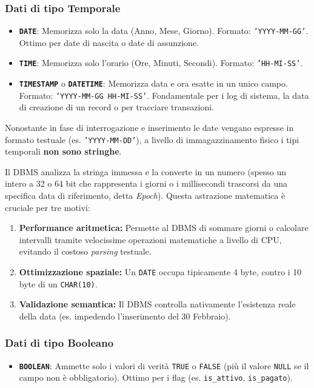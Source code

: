 \subsubsection*{Dati di tipo Temporale}
\begin{itemize}
    \item \texttt{\textbf{DATE}}: Memorizza solo la data (Anno, Mese, Giorno). Formato: \texttt{'YYYY-MM-GG'}. Ottimo per date di nascita o date di assunzione.
    \item \texttt{\textbf{TIME}}: Memorizza solo l'orario (Ore, Minuti, Secondi). Formato: \texttt{'HH-MI-SS'}.
    \item \texttt{\textbf{TIMESTAMP}} o \texttt{\textbf{DATETIME}}: Memorizza data e ora esatte in un unico campo. Formato: \texttt{'YYYY-MM-GG HH-MI-SS'}. Fondamentale per i log di sistema, la data di creazione di un record o per tracciare transazioni.
\end{itemize}

\begin{dettagli}
Nonostante in fase di interrogazione e inserimento le date vengano espresse in formato testuale (es. \texttt{'YYYY-MM-DD'}), a livello di immagazzinamento fisico i tipi temporali \textbf{non sono stringhe}. 

Il DBMS analizza la stringa immessa e la converte in un numero (spesso un intero a 32 o 64 bit che rappresenta i giorni o i millisecondi trascorsi da una specifica data di riferimento, detta \textit{Epoch}). 
Questa astrazione matematica è cruciale per tre motivi:
\begin{enumerate}
    \item \textbf{Performance aritmetica:} Permette al DBMS di sommare giorni o calcolare intervalli tramite velocissime operazioni matematiche a livello di CPU, evitando il costoso \textit{parsing} testuale.
    \item \textbf{Ottimizzazione spaziale:} Un \texttt{DATE} occupa tipicamente 4 byte, contro i 10 byte di un \texttt{CHAR(10)}.
    \item \textbf{Validazione semantica:} Il DBMS controlla nativamente l'esistenza reale della data (es. impedendo l'inserimento del 30 Febbraio).
\end{enumerate}
\end{dettagli}

\subsubsection*{Dati di tipo Booleano}
\begin{itemize}
    \item \texttt{\textbf{BOOLEAN}}: Ammette solo i valori di verità \texttt{TRUE} o \texttt{FALSE} (più il valore \texttt{NULL} se il campo non è obbligatorio). Ottimo per i flag (es. \texttt{is\_attivo}, \texttt{is\_pagato}).
\end{itemize}

